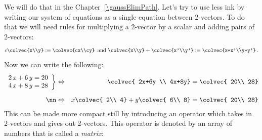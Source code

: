 %
We will do that in the Chapter~\ref{\gaussElimPath}. Let's try to use less ink by writing our system of  equations as a single equation between 2-vectors.
To do that we will need rules for multiplying a 2-vector by a scalar and adding pairs of 2-vectors:
\[
c\colvec{x\\y}:=\colvec{cx\\cy}\, \mbox{ and } \colvec{x\\y}+\colvec{x'\\y'}:=\colvec{x+x'\\y+y'}\, .
\]
Now we can write the following:
\begin{align*}
   \left.
\begin{array}{lr}
   	2\, x + 6\, y  =  20 \\
	4\, x + 8\, y  =  28
     \end{array}
   \right\} 
& \Leftrightarrow&    \colvec{ 2x+6y \\ 4x+8y}  =\colvec{ 20\\ 28}\\[2mm] \nn 
&\Leftrightarrow&
   x \colvec{ 2\\ 4} + y \colvec{ 6\\ 8} =\colvec{ 20\\ 28} 
\end{align*}
This can be made more compact still by introducing an operator which takes in 2-vectors and gives out 2-vectors. This operator is denoted by an array of numbers that  is called a {\itshape matrix}:

